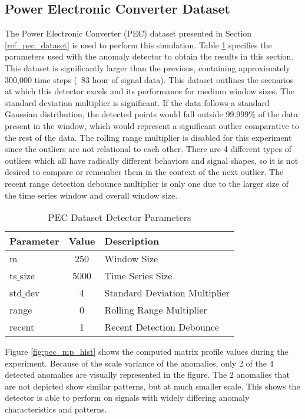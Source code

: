 \subsection{Power Electronic Converter Dataset}
\label{ref_results_pec_sim}
The Power Electronic Converter (PEC) dataset presented in Section \ref{ref_pec_dataset} is used to perform this simulation. Table \ref{tab:pec_sim_params} specifies the parameters used with the anomaly detector to obtain the results in this section. This dataset is significantly larger than the previous, containing approximately 300,000 time steps (~83 hour of signal data). This dataset outlines the scenarios at which this detector excels and its performance for medium window sizes. The standard deviation multiplier is significant. If the data follows a standard Gaussian distribution, the detected points would fall outside 99.999\% of the data present in the window, which would represent a significant outlier comparative to the rest of the data. The rolling range multiplier is disabled for this experiment since the outliers are not relational to each other. There are 4 different types of outliers which all have radically different behaviors and signal shapes, so it is not desired to compare or remember them in the context of the next outlier. The recent range detection debounce multiplier is only one due to the larger size of the time series window and overall window size.

\begin{table}[H]
\caption{PEC Dataset Detector Parameters}
\begin{tabular}{|l|c|l|}
    \hline
	\textbf{Parameter} & \textbf{Value} & \textbf{Description} \\ \hline
	m & 250 & Window Size \\ \hline
	ts$\_$size & 5000 & Time Series Size \\ \hline
	std$\_$dev & 4 & Standard Deviation Multiplier \\ \hline
	range & 0 & Rolling Range Multiplier\\ \hline
	recent & 1 & Recent Detection Debounce\\ \hline
\end{tabular}
\label{tab:pec_sim_params}
\end{table}

Figure \ref{fig:pec_mp_hist} shows the computed matrix profile values during the experiment. Because of the scale variance of the anomalies, only 2 of the 4 detected anomalies are visually represented in the figure. The 2 anomalies that are not depicted show similar patterns, but at much smaller scale. This shows the detector is able to perform on signals with widely differing anomaly characteristics and patterns.

